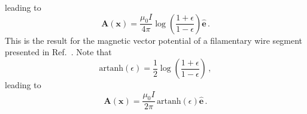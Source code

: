 leading to
\begin{equation}
 \mathbf{A}(\mathbf{x}) = \frac{\mu_0 I}{4 \pi} \log\left(\frac{1 + \epsilon}{1 - \epsilon} \right) \hat{\mathbf{e}} \, . \label{eqn:A_log_eps}
\end{equation}
This is the result for the magnetic vector potential of a filamentary wire segment presented in Ref.~\cite{hanson_hirshman_2002}.
Note that
\begin{equation}
 \mathrm{artanh}\left( \epsilon \right) = \frac{1}{2} \log\left(\frac{1 + \epsilon}{1 - \epsilon} \right) \, ,
\end{equation}
leading to
\begin{equation}
 \mathbf{A}(\mathbf{x}) = \frac{\mu_0 I}{2 \pi} \, \mathrm{artanh} \left( \epsilon \right) \hat{\mathbf{e}} \, . \label{eqn:A_artanh}
\end{equation}

